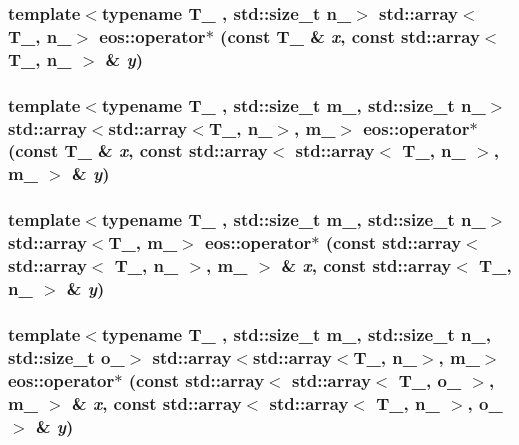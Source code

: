 \hypertarget{namespaceeos_a6192a8a135c1f4ea6163e1d7f59275a0}{
\subsubsection[{operator$\ast$}]{\setlength{\rightskip}{0pt plus 5cm}template$<$typename T\_\- , std::size\_\-t n\_\-$>$ std::array$<$T\_\-, n\_\-$>$ eos::operator$\ast$ (const T\_\- \& {\em x}, \/  const std::array$<$ T\_\-, n\_\- $>$ \& {\em y})}}
\label{namespaceeos_a6192a8a135c1f4ea6163e1d7f59275a0}
\hypertarget{namespaceeos_ab6da54e708e1d703fd399d7e7a0912f8}{
\subsubsection[{operator$\ast$}]{\setlength{\rightskip}{0pt plus 5cm}template$<$typename T\_\- , std::size\_\-t m\_\-, std::size\_\-t n\_\-$>$ std::array$<$std::array$<$T\_\-, n\_\-$>$, m\_\-$>$ eos::operator$\ast$ (const T\_\- \& {\em x}, \/  const std::array$<$ std::array$<$ T\_\-, n\_\- $>$, m\_\- $>$ \& {\em y})}}
\label{namespaceeos_ab6da54e708e1d703fd399d7e7a0912f8}
\hypertarget{namespaceeos_adf0061c40e232b18c6cb38c998b4cde1}{
\subsubsection[{operator$\ast$}]{\setlength{\rightskip}{0pt plus 5cm}template$<$typename T\_\- , std::size\_\-t m\_\-, std::size\_\-t n\_\-$>$ std::array$<$T\_\-, m\_\-$>$ eos::operator$\ast$ (const std::array$<$ std::array$<$ T\_\-, n\_\- $>$, m\_\- $>$ \& {\em x}, \/  const std::array$<$ T\_\-, n\_\- $>$ \& {\em y})}}
\label{namespaceeos_adf0061c40e232b18c6cb38c998b4cde1}
\hypertarget{namespaceeos_a6025a42d446265afd81f6c749999a391}{
\subsubsection[{operator$\ast$}]{\setlength{\rightskip}{0pt plus 5cm}template$<$typename T\_\- , std::size\_\-t m\_\-, std::size\_\-t n\_\-, std::size\_\-t o\_\-$>$ std::array$<$std::array$<$T\_\-, n\_\-$>$, m\_\-$>$ eos::operator$\ast$ (const std::array$<$ std::array$<$ T\_\-, o\_\- $>$, m\_\- $>$ \& {\em x}, \/  const std::array$<$ std::array$<$ T\_\-, n\_\- $>$, o\_\- $>$ \& {\em y})}}

